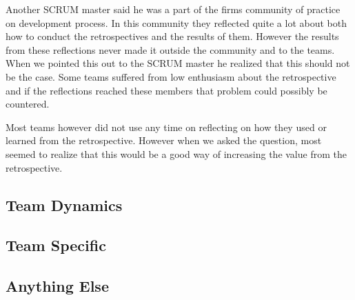 Another SCRUM master said he was a part of the firms community of practice on development process. In this community they reflected quite a lot about both how to conduct the retrospectives and the results of them. However the results from these reflections never made it outside the community and to the teams. When we pointed this out to the SCRUM master he realized that this should not be the case. Some teams suffered from low enthusiasm about the retrospective and if the reflections reached these members that problem could possibly be countered. 

Most teams however did not use any time on reflecting on how they used or learned from the retrospective. However when we asked the question, most seemed to realize that this would be a good way of increasing the value from the retrospective. 




\subsection{Team Dynamics} %
\label{sub:team_dynamics}


\subsection{Team Specific} %
\label{sub:team_specific}


\subsection{Anything Else} %
\label{sub:anything_else}

